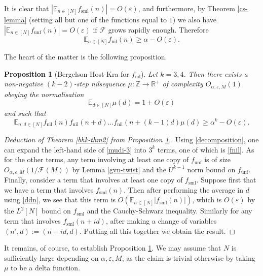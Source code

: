 \documentclass[11pt,reqno]{amsart}
\numberwithin{equation}{section}
\theoremstyle{plain}
\newtheorem{proposition}[subsection]{Proposition}
\theoremstyle{definition}
\renewcommand{\geq}{\geqslant}
\newcommand\E{{\mathbb{E}}}
\newcommand\Z{\mathbb{Z}}
\newcommand\R{\mathbb{R}}
\newcommand\1{{\bf 1}}
\newcommand\2{{\bf 2}}
\newcommand\eps{\varepsilon}
\newcommand\nil{{\operatorname{nil}}}
\newcommand\sml{{\operatorname{sml}}}
\newcommand\unf{{\operatorname{unf}}}
\newcommand\Grow{{\mathcal F}}
\begin{document}
It is clear that $| \E_{n \in [N]} f_{\sml}(n)| = O(\eps)$, and furthermore, by Theorem \ref{cs-lemma} (setting all but one of the functions equal to $1$) we also have $|\E_{n \in [N]} f_{\unf}(n)| = O(\eps)$ if $\Grow$ grows rapidly enough.
Therefore 
\begin{equation}\label{nnil}
 \E_{n \in [N]} f_\nil(n) \geq \alpha - O(\eps).
\end{equation}

The heart of the matter is the following proposition.

\begin{proposition}[Bergelson-Host-Kra for $f_\nil$]\label{bhk-prop}  Let $k=3,4$.  Then there exists a non-negative $(k-2)$-step nilsequence $\mu: \Z \to \R^+$ of complexity $O_{\alpha,\eps,M}(1)$ obeying the normalisation
\begin{equation}\label{ddn}
\E_{d \in [N]} \mu(d) = 1 + O(\eps)
\end{equation}
and such that
\begin{equation}\label{fnil}
 \E_{n,d \in [N]}  f_\nil(n) f_\nil(n+d) \ldots f_\nil(n+(k-1)d)\mu(d)  \geq \alpha^k - O( \eps).
\end{equation}
\end{proposition}

\begin{proof}[Deduction of Theorem \ref{bhk-thm2} from Proposition \ref{bhk-prop}.]  Using \eqref{decomposition}, one can expand the left-hand side of \eqref{mudi-3} into $3^k$ terms, one of which is \eqref{fnil}.  As for the other terms, any term involving at least one copy of $f_\unf$ is of size $O_{\alpha,\eps,M}(1/\Grow(M))$ by Lemma \ref{gvn-twist} and the $U^{k-1}$ norm bound on $f_\unf$.  Finally, consider a term that involves at least one copy of $f_\sml$.  Suppose first that we have a term that involves $f_\sml(n)$.  Then after performing the average in $d$ using \eqref{ddn}, we see that this term is $O( \E_{n \in [N]} |f_\sml(n)|)$, which is $O(\eps)$ by the $L^2[N]$ bound on $f_\sml$ and the Cauchy-Schwarz inequality.  Similarly for any term that involves $f_\sml(n+id)$, after making a change of variables $(n',d) := (n+id,d)$.  Putting all this together we obtain the result. 
\end{proof}

It remains, of course, to establish Proposition \ref{bhk-prop}.  We may assume that $N$ is sufficiently large depending on $\alpha,\eps,M$, as the claim is trivial otherwise by taking $\mu$ to be a delta function.
\end{document}

